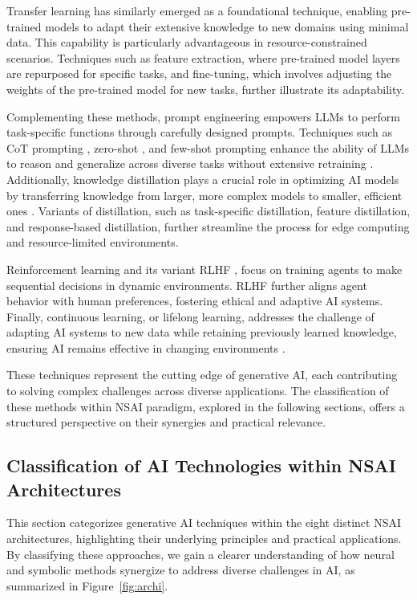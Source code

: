 \documentclass[12pt]{article}
\begin{document}
Transfer learning \cite{iman2023review} has similarly emerged as a foundational technique, enabling pre-trained models to adapt their extensive knowledge to new domains using minimal data. This capability is particularly advantageous in resource-constrained scenarios. Techniques such as feature extraction, where pre-trained model layers are repurposed for specific tasks, and fine-tuning, which involves adjusting the weights of the pre-trained model for new tasks, further illustrate its adaptability. 

Complementing these methods, prompt engineering empowers LLMs to perform task-specific functions through carefully designed prompts. Techniques such as CoT prompting \cite{wei2022chain}, zero-shot \cite{pourpanah2022review}, and few-shot prompting  enhance the ability of LLMs to reason and generalize across diverse tasks without extensive retraining \cite{reynolds2021prompt}. Additionally, knowledge distillation  plays a crucial role in optimizing AI models by transferring knowledge from larger, more complex models to smaller, efficient ones \cite{gou2021knowledge}. Variants of distillation, such as task-specific distillation, feature distillation, and response-based distillation, further streamline the process for edge computing and resource-limited environments.

Reinforcement learning and its variant RLHF \cite{dai2023safe}, focus on training agents to make sequential decisions in dynamic environments. RLHF further aligns agent behavior with human preferences, fostering ethical and adaptive AI systems. Finally, continuous learning, or lifelong learning, addresses the challenge of adapting AI systems to new data while retaining previously learned knowledge, ensuring AI remains effective in changing environments \cite{riseAI}.

These techniques represent the cutting edge of generative AI, each contributing to solving complex challenges across diverse applications. The classification of these methods within NSAI paradigm, explored in the following sections, offers a structured perspective on their synergies and practical relevance.

\subsection{Classification of AI Technologies within NSAI Architectures}
This section categorizes generative AI techniques within the eight distinct NSAI architectures, highlighting their underlying principles and practical applications. By classifying these approaches, we gain a clearer understanding of how neural and symbolic methods synergize to address diverse challenges in AI, as summarized in Figure~\ref{fig:archi}.
\end{document}
